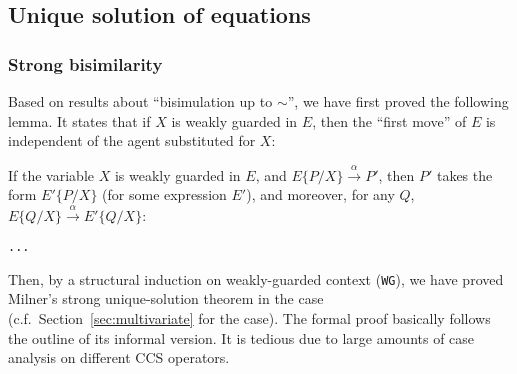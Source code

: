 
\subsection{Unique solution of equations}
\label{ss:part2}

\subsubsection{Strong bisimilarity}

Based on results about ``bisimulation up to $\sim$'', we have first proved the following
 lemma. It states  that if $X$ is weakly guarded
in $E$, then the ``first move'' of $E$ is independent of the agent
substituted for $X$:
\begin{lemma}
\label{lem:313}
If the variable $X$ is weakly guarded in $E$, and
$E\{P/X\}\overset{\alpha}{\rightarrow} P'$, then $P'$ takes the form
$E'\{P/X\}$ (for some expression $E'$), and moreover, for any $Q$,
$E\{Q/X\}\overset{\alpha}{\rightarrow} E'\{Q/X\}$:
\begin{alltt}
\HOLTokenTurnstile{}   \HOLSymConst{\HOLTokenImp{}}
   \HOLSymConst{\HOLTokenForall{}}  .   \HOLTokenTransBegin{}\HOLTokenTransEnd {} \HOLSymConst{\HOLTokenImp{}} \HOLSymConst{\HOLTokenExists{}}.   \HOLSymConst{\HOLTokenConj{}}  \HOLSymConst{\ensuremath{=}}   \HOLSymConst{\HOLTokenConj{}} \HOLSymConst{\HOLTokenForall{}}.   \HOLTokenTransBegin{}\HOLTokenTransEnd {} 
\end{alltt}
\end{lemma}

Then, by a structural induction on weakly-guarded context
(\texttt{WG}), we have proved Milner's strong unique-solution theorem
in the \univariate case (c.f.~Section~\ref{sec:multivariate} for the
\multivariate case). The formal proof basically follows the outline of its
informal version. It is tedious due to large amounts of case analysis
on different CCS operators.

